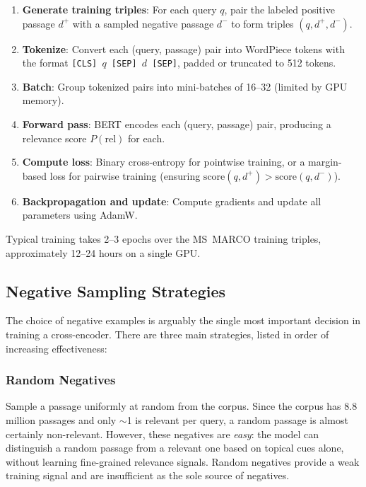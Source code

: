 \documentclass[11pt,a4paper]{article}
\theoremstyle{definition}
\theoremstyle{plain}
\begin{document}
\begin{enumerate}
    \item \textbf{Generate training triples}: For each query $q$, pair the labeled positive passage $d^+$ with a sampled negative passage $d^-$ to form triples $(q, d^+, d^-)$.
    
    \item \textbf{Tokenize}: Convert each (query, passage) pair into WordPiece tokens with the format \texttt{[CLS] $q$ [SEP] $d$ [SEP]}, padded or truncated to 512 tokens.
    
    \item \textbf{Batch}: Group tokenized pairs into mini-batches of 16--32 (limited by GPU memory).
    
    \item \textbf{Forward pass}: BERT encodes each (query, passage) pair, producing a relevance score $P(\text{rel})$ for each.
    
    \item \textbf{Compute loss}: Binary cross-entropy for pointwise training, or a margin-based loss for pairwise training (ensuring $\text{score}(q, d^+) > \text{score}(q, d^-)$).
    
    \item \textbf{Backpropagation and update}: Compute gradients and update all parameters using AdamW.
\end{enumerate}

Typical training takes 2--3 epochs over the MS~MARCO training triples, approximately 12--24 hours on a single GPU.

\subsection{Negative Sampling Strategies}

The choice of negative examples is arguably the single most important decision in training a cross-encoder. There are three main strategies, listed in order of increasing effectiveness:

\subsubsection{Random Negatives}

Sample a passage uniformly at random from the corpus. Since the corpus has 8.8 million passages and only $\sim$1 is relevant per query, a random passage is almost certainly non-relevant. However, these negatives are \emph{easy}: the model can distinguish a random passage from a relevant one based on topical cues alone, without learning fine-grained relevance signals. Random negatives provide a weak training signal and are insufficient as the sole source of negatives.
\end{document}
